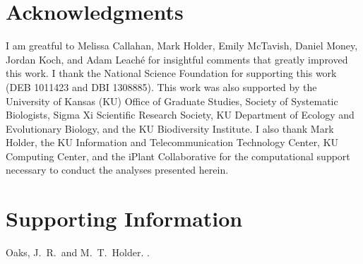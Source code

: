 \documentclass[letterpaper,12pt]{article}
\makeatletter
\let\msTitle\@title
\makeatother
\begin{document}
\newpage



\section{Acknowledgments}
I am greatful to Melissa Callahan, Mark Holder, Emily McTavish, Daniel Money,
Jordan Koch, and Adam Leach\'{e} for insightful comments that greatly improved
this work.
I thank the National Science Foundation for supporting this work (DEB
1011423 and DBI 1308885).
This work was also supported by the University of Kansas (KU) Office of Graduate
Studies, Society of Systematic Biologists, Sigma Xi Scientific Research
Society, KU Department of Ecology and Evolutionary Biology, and the KU
Biodiversity Institute.
I also thank Mark Holder, the KU Information and Telecommunication Technology
Center, KU Computing Center, and the iPlant Collaborative for the computational
support necessary to conduct the analyses presented herein.



\newpage
\singlespacing

\renewcommand\listfigurename{Figure Captions}
\renewcommand\cftdotsep{\cftnodots}
\setlength\cftbeforefigskip{10pt}
\listoffigures



\newpage
\singlespacing



\clearpage

\newpage



\setcounter{figure}{0}
\setcounter{table}{0}
\setcounter{page}{1}
\setcounter{section}{0}

\singlespacing

\section*{Supporting Information}
\hangindent=1cm
Oaks, J.~R.\ and M.~T.\ Holder. \msTitle.

\newpage
\singlespacing


\end{document}
